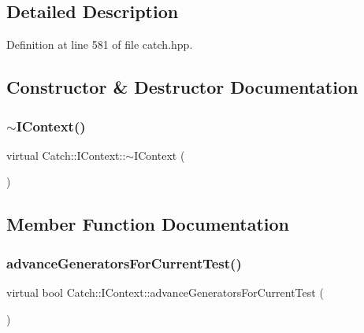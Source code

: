 \subsection{Detailed Description}


Definition at line 581 of file catch.\+hpp.



\subsection{Constructor \& Destructor Documentation}
\hypertarget{struct_catch_1_1_i_context_aeb17355c1be6c2ced5407cad7202628d}{}\label{struct_catch_1_1_i_context_aeb17355c1be6c2ced5407cad7202628d} 
\subsubsection{\texorpdfstring{$\sim$\+I\+Context()}{~IContext()}}
{\footnotesize\ttfamily virtual Catch\+::\+I\+Context\+::$\sim$\+I\+Context (\begin{DoxyParamCaption}{ }\end{DoxyParamCaption})\hspace{0.3cm}{\ttfamily [virtual]}}



\subsection{Member Function Documentation}
\hypertarget{struct_catch_1_1_i_context_a806f7c4ed24d51adae90418e661b24b7}{}\label{struct_catch_1_1_i_context_a806f7c4ed24d51adae90418e661b24b7} 
\subsubsection{\texorpdfstring{advance\+Generators\+For\+Current\+Test()}{advanceGeneratorsForCurrentTest()}}
{\footnotesize\ttfamily virtual bool Catch\+::\+I\+Context\+::advance\+Generators\+For\+Current\+Test (\begin{DoxyParamCaption}{ }\end{DoxyParamCaption})\hspace{0.3cm}{\ttfamily [pure virtual]}}

